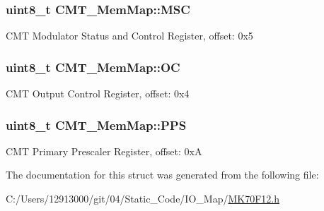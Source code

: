 \subsubsection[{M\+S\+C}]{\setlength{\rightskip}{0pt plus 5cm}uint8\+\_\+t C\+M\+T\+\_\+\+Mem\+Map\+::\+M\+S\+C}\label{struct_c_m_t___mem_map_ad1905c6966e1ac635348ce19d5c44ae9}
C\+M\+T Modulator Status and Control Register, offset\+: 0x5 \hypertarget{struct_c_m_t___mem_map_a67d3243d0c24b20b493fd919433dd84c}{}
\subsubsection[{O\+C}]{\setlength{\rightskip}{0pt plus 5cm}uint8\+\_\+t C\+M\+T\+\_\+\+Mem\+Map\+::\+O\+C}\label{struct_c_m_t___mem_map_a67d3243d0c24b20b493fd919433dd84c}
C\+M\+T Output Control Register, offset\+: 0x4 \hypertarget{struct_c_m_t___mem_map_a3a70b1ee9e4f0c56e0b2f48e059e1590}{}
\subsubsection[{P\+P\+S}]{\setlength{\rightskip}{0pt plus 5cm}uint8\+\_\+t C\+M\+T\+\_\+\+Mem\+Map\+::\+P\+P\+S}\label{struct_c_m_t___mem_map_a3a70b1ee9e4f0c56e0b2f48e059e1590}
C\+M\+T Primary Prescaler Register, offset\+: 0x\+A 

The documentation for this struct was generated from the following file\+:\begin{DoxyCompactItemize}
\item 
C\+:/\+Users/12913000/git/04/\+Static\+\_\+\+Code/\+I\+O\+\_\+\+Map/\hyperlink{_m_k70_f12_8h}{M\+K70\+F12.\+h}\end{DoxyCompactItemize}
